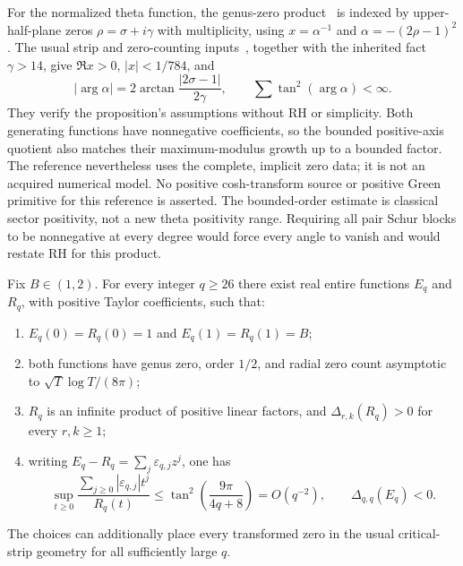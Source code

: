 For the normalized theta function, the genus-zero product~\cite{Katkova0505174v1} is indexed
by upper-half-plane zeros $\rho=\sigma+i\gamma$ with multiplicity,
using $x=\alpha^{-1}$ and $\alpha=-(2\rho-1)^2$. The usual strip and
zero-counting inputs~\cite{Odlyzko1987AuthorCopy}, together with the inherited fact $\gamma>14$,
give $\Re x>0$, $|x|<1/784$, and
\[
 |\arg\alpha|=2\arctan\frac{|2\sigma-1|}{2\gamma},
 \qquad\sum\tan^2(\arg\alpha)<\infty.
\]
They verify the proposition's assumptions without RH or simplicity.
Both generating functions have nonnegative coefficients, so the
bounded positive-axis quotient also matches their maximum-modulus
growth up to a bounded factor. The reference nevertheless uses the
complete, implicit zero data; it is not an acquired numerical model.
No positive cosh-transform source or positive Green primitive for this
reference is asserted. The bounded-order estimate is classical sector
positivity, not a new theta positivity range. Requiring all pair Schur
blocks to be nonnegative at every degree would force every angle to
vanish and would restate RH for this product.

\begin{theorem}
\label{thm:diagonal-pair-control}
Fix $B\in(1,2)$. For every integer $q\ge26$ there exist real entire
functions $E_q$ and $R_q$, with positive Taylor coefficients, such that:
\begin{enumerate}
 \item $E_q(0)=R_q(0)=1$ and $E_q(1)=R_q(1)=B$;
 \item both functions have genus zero, order $1/2$, and radial zero
 count asymptotic to $\sqrt T\log T/(8\pi)$;
 \item $R_q$ is an infinite product of positive linear factors, and
 $\Delta_{r,k}(R_q)>0$ for every $r,k\ge1$;
 \item writing $E_q-R_q=\sum_j\varepsilon_{q,j}z^j$, one has
 \begin{equation}
 \sup_{t\ge0}
 \frac{\sum_{j\ge0}|\varepsilon_{q,j}|t^j}{R_q(t)}
 \le\tan^2\!\left(\frac{9\pi}{4q+8}\right)=O(q^{-2}),
 \qquad \Delta_{q,q}(E_q)<0.
 \label{eq:diagonal-control-conclusion}
 \end{equation}
\end{enumerate}
The choices can additionally place every transformed zero in the
usual critical-strip geometry for all sufficiently large $q$.
\end{theorem}


